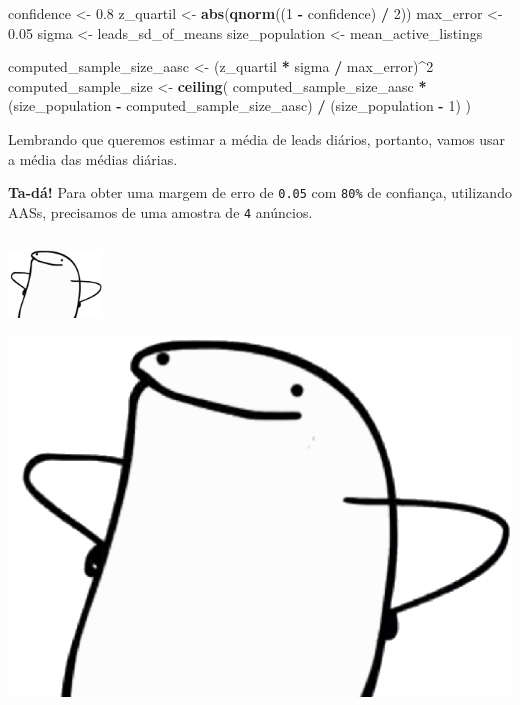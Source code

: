 \documentclass[
]{article}
\newenvironment{Shaded}{\begin{snugshade}}{\end{snugshade}}
\newcommand{\DecValTok}[1]{\textcolor[rgb]{0.00,0.00,0.81}{#1}}
\newcommand{\FloatTok}[1]{\textcolor[rgb]{0.00,0.00,0.81}{#1}}
\newcommand{\FunctionTok}[1]{\textcolor[rgb]{0.13,0.29,0.53}{\textbf{#1}}}
\newcommand{\NormalTok}[1]{#1}
\newcommand{\OtherTok}[1]{\textcolor[rgb]{0.56,0.35,0.01}{#1}}
\newcommand{\SpecialCharTok}[1]{\textcolor[rgb]{0.81,0.36,0.00}{\textbf{#1}}}
\let\oldincludegraphics\includegraphics
\renewcommand{\includegraphics}[2][]{ \ifthenelse{ \equal{#1}{} } { \oldincludegraphics[width=2.5cm,height=2.5cm,keepaspectratio=true]{#2} } { \oldincludegraphics[#1]{#2} } }
\begin{document}
\begin{Shaded}
\begin{Highlighting}[]
\NormalTok{confidence }\OtherTok{\textless{}{-}} \FloatTok{0.8}
\NormalTok{z\_quartil }\OtherTok{\textless{}{-}} \FunctionTok{abs}\NormalTok{(}\FunctionTok{qnorm}\NormalTok{((}\DecValTok{1} \SpecialCharTok{{-}}\NormalTok{ confidence) }\SpecialCharTok{/} \DecValTok{2}\NormalTok{))}
\NormalTok{max\_error }\OtherTok{\textless{}{-}} \FloatTok{0.05}
\NormalTok{sigma }\OtherTok{\textless{}{-}}\NormalTok{ leads\_sd\_of\_means}
\NormalTok{size\_population }\OtherTok{\textless{}{-}}\NormalTok{ mean\_active\_listings}

\NormalTok{computed\_sample\_size\_aasc }\OtherTok{\textless{}{-}}\NormalTok{ (z\_quartil }\SpecialCharTok{*}\NormalTok{ sigma }\SpecialCharTok{/}\NormalTok{ max\_error)}\SpecialCharTok{\^{}}\DecValTok{2}
\NormalTok{computed\_sample\_size }\OtherTok{\textless{}{-}} \FunctionTok{ceiling}\NormalTok{(}
\NormalTok{  computed\_sample\_size\_aasc }\SpecialCharTok{*}
\NormalTok{    (size\_population }\SpecialCharTok{{-}}\NormalTok{ computed\_sample\_size\_aasc) }\SpecialCharTok{/}\NormalTok{ (size\_population }\SpecialCharTok{{-}} \DecValTok{1}\NormalTok{)}
\NormalTok{)}
\end{Highlighting}
\end{Shaded}

Lembrando que queremos estimar a média de leads diários, portanto, vamos
usar a média das médias diárias.

\textbf{Ta-dá!} Para obter uma margem de erro de \texttt{0.05} com
\texttt{80\%} de confiança, utilizando AASs, precisamos de uma amostra
de \texttt{4} anúncios.

\includegraphics{./images/flork-orgulhoso.png}
\end{document}
